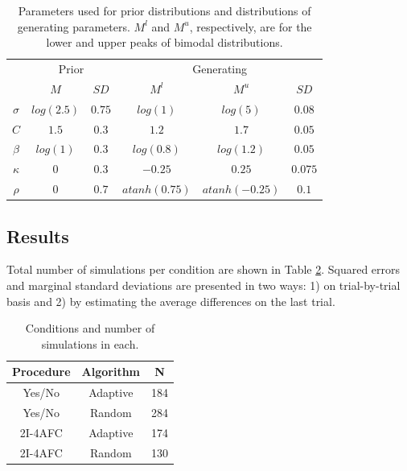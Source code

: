 \documentclass{article}\usepackage{knitr}
\begin{document}
\begin{table}[H]
\centering
\caption{Parameters used for prior distributions and distributions of generating parameters. $M^l$ and $M^u$, respectively, are for the lower and upper peaks of bimodal distributions.}
\vspace{0.5cm}
\begin{tabular}{cccccc}
\toprule

          & \multicolumn{2}{c}{Prior} & \multicolumn{3}{c}{Generating}   \\
          \cmidrule(lr){2-3}\cmidrule(lr){4-6}
          & $M$       & $SD$    & $M^l$         & $M^u$         & $SD$   \\
\midrule
$\sigma$  & $log(2.5)$  & $0.75$   & $log(1)$    & $log(5)$    & $0.08$ \\
$C$       & $1.5$            & $0.3$   & $1.2$         & $1.7$         & $0.05$  \\
$\beta$   & $log(1)$  & $0.3$   & $log(0.8)$    & $log(1.2)$    & $0.05$ \\
$\kappa$  & $0$            & $0.3$   & $-0.25$        & $0.25$         & $0.075$ \\
$\rho$    & $0$            & $0.7$  & $atanh(0.75)$ & $atanh(-0.25)$  & $0.1$ \\
\bottomrule
\end{tabular}
\label{tab:priors}
\end{table}

\subsection{Results}

Total number of simulations per condition are shown in Table \ref{tab:conditions}. Squared errors and marginal standard deviations are presented in two ways: 1) on trial-by-trial basis and 2) by estimating the average differences on the last trial.

\begin{table}[H]
\centering
\caption{Conditions and number of simulations in each.}
\vspace{0.5cm}
\begin{tabular}{ccc}

\toprule
Procedure & Algorithm & N \\
\midrule
Yes/No & Adaptive & 184 \\
Yes/No & Random & 284 \\
2I-4AFC & Adaptive & 174 \\
2I-4AFC & Random & 130 \\

\bottomrule

\end{tabular}

\label{tab:conditions}
\end{table}
\end{document}
